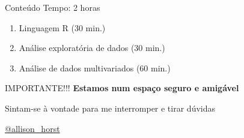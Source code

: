 \documentclass[
  ignorenonframetext,
]{beamer}
\providecommand{\tightlist}{%
  \setlength{\itemsep}{0pt}\setlength{\parskip}{0pt}}\usepackage{longtable,booktabs,array}
\begin{document}
\begin{frame}
\begin{block}{Conteúdo}
\protect\hypertarget{conteuxfado}{}
Tempo: 2 horas

\begin{enumerate}
\tightlist
\item
  Linguagem R (30 min.)
\item
  Análise exploratória de dados (30 min.)
\item
  Análise de dados multivariados (60 min.)
\end{enumerate}
\end{block}

\begin{block}{IMPORTANTE!!!}
\protect\hypertarget{importante}{}
\textbf{Estamos num espaço seguro e amigável}

Sintam-se à vontade para me interromper e tirar dúvidas

\href{https://twitter.com/allison_horst}{@allison\_horst}
\end{block}
\end{frame}
\end{document}
